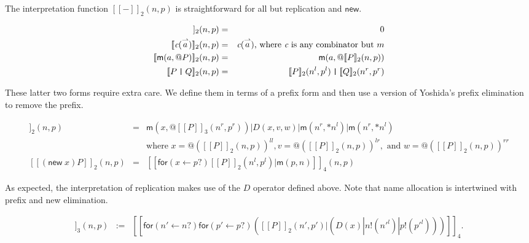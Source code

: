 \documentclass[submission,copyright,creativecommons]{eptcs}
\makeatletter
\newcommand{\new}{\mathsf{new}}
\newcommand{\ldb}{[\![}
\newcommand{\rdb}{]\!]}
\newcommand{\id}[1]{\texttt{#1}}
\newcommand{\pzero}{\mathbin{0}}
\newcommand{\juxtap}{\mathbin{\id{|}}}
\newcommand{\binpar}[2]{#1 | #2}
\newcommand{\outputp}[2]{#1!(#2)}
\newcommand{\prefix}[3]{\mathsf{for}(#2 \leftarrow #1?) #3}
\newcommand{\quotep}[1]{\mathsf{@}#1}
\newcommand{\meaningof}[1]{\ldb #1 \rdb}
\newcommand{\vect}[1]{\stackrel{\rightharpoonup}{#1}}
\theoremstyle{definition}
\theoremstyle{remark}
\theoremstyle{remark}
\makeatother
\begin{document}
The interpretation function $\meaningof{-}_2(n, p)$ is straightforward
for all but replication and $\mathsf{new}$.

\begin{eqnarray*}
    \meaningof{\pzero}_2 (n,p)
      & = &
       \pzero \\
    \meaningof{\emph{c}(\vect{a})}_2 (n,p) 
      & = & 
      \emph{c}(\vect{a})\mbox{, where $\emph{c}$ is any combinator but $m$} \\
    \meaningof{\mathsf{m}(a,\quotep{P})}_2 (n,p) 
      & = & 
          \mathsf{m}(a, \quotep{\meaningof{P}}_2 (n,p)) \\
    \meaningof{P \juxtap Q}_2 (n,p) 
      & = & 
    \meaningof{P}_2 (n^l, p^l)
         \juxtap \meaningof{Q}_2 (n^r, p^r) \\ 
\end{eqnarray*}

These latter two forms require extra care. We define them in terms of
a prefix form and then use a version of Yoshida's prefix elimination
to remove the prefix.

\begin{eqnarray*}
    \meaningof{\mathsf{*} P}_2 (n,p)
          & = & \binpar{\mathsf{m}(x, \quotep{\meaningof{P}_3(n^r,p^r)})}
                  {\binpar{D(x,v,w)}
                    {\binpar{\mathsf{m}(n^r, *n^l)}{\mathsf{m}(n^r, *n^l)}}} \\
                  & & \mbox{where } 
                      x = @(\meaningof{P}_2(n,p))^{ll}, 
                      v = @(\meaningof{P}_2(n,p))^{lr}, \mbox{ and }
                      w = @(\meaningof{P}_2(n,p))^{rr} \\
    \meaningof{(\new \; x ) P}_2 (n, p) 
          & = & 
         \meaningof{\prefix{p}{x}{\binpar{\meaningof{P}_2 ( n^l, p^l )}{\mathsf{m}(p, n)}}}_4(n, p)
\end{eqnarray*}

As expected, the interpretation of replication makes use of the $D$
operator defined above. Note that name allocation is intertwined with
prefix and new elimination.
         
\begin{eqnarray*}
  \meaningof{P}_3(n, p) 
    & := & 
      \meaningof{\prefix{n}{n'}{\prefix{p}{p'}{(\binpar{\meaningof{P}_2(n',p')}
        {(\binpar{D(x)}{\binpar{\outputp{n}{n'^l}}{\outputp{p}{p'^l}}})})}}}_4. \\
\end{eqnarray*}
\end{document}
